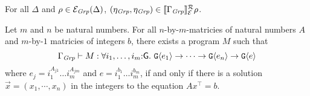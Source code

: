 \begin{lemma}
  For all $\Delta$ and $\rho \in \mathcal{E}_{\mathit{Grp}}(\Delta)$,
  $(\eta_{\mathit{Grp}},\eta_{\mathit{Grp}}) \in \llbracket \Gamma_{\mathit{Grp}} \rrbracket^{\mathcal{R}}_{\mathcal{E}}{\rho}$.
\end{lemma}

\begin{theorem}
  Let $m$ and $n$ be natural numbers. For all $n$-by-$m$-matricies of
  natural numbers $A$ and $m$-by-$1$ matricies of integers $b$,
  there exists a program $M$ such that
  \begin{equation}
    \label{eq:fo-group-type}
    \Gamma_\Grp \vdash M : \forall i_1,\dots,i_m\mathord:\mathsf{G}.\ \tyPrim{G}{e_1} \to \dots \to \tyPrim{G}{e_n} \to \tyPrim{G}{e}
  \end{equation}
  where $e_j = i_1^{A_{j1}}\dots i_m^{A_{jm}}$ and $e = i_1^{b_1}\dots
  i_m^{b_m}$, if and only if there is a solution $\vec{x} =
  (x_1,\cdots,x_n)$ in the integers to the equation $A x^\top = b$.
\end{theorem}


